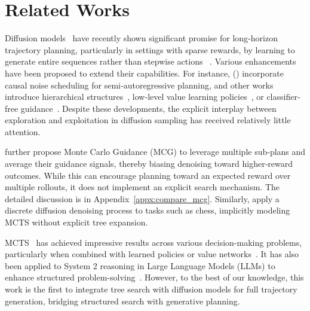 \section{Related Works}
Diffusion models~\citep{diffusion} have recently shown significant promise for long‐horizon trajectory planning, particularly in settings with sparse rewards, by learning to generate entire sequences rather than stepwise actions~ \citep{diffuser, diffusion_forcing, decisiondiffuer, d-mpc, hd, plandq, hmd}. Various enhancements have been proposed to extend their capabilities. For instance, \citeauthor{diffusion_forcing}(\citeyear{diffusion_forcing}) incorporate causal noise scheduling for semi‐autoregressive planning, and other works introduce hierarchical structures~\citep{hd, plandq, hmd}, low‐level value learning policies~\citep{plandq}, or classifier‐free guidance~\citep{decisiondiffuer, d-mpc}. Despite these developments, the explicit interplay between exploration and exploitation in diffusion sampling has received relatively little attention.

\citet{diffusion_forcing} further propose Monte Carlo Guidance (MCG) to leverage multiple sub‐plans and average their guidance signals, thereby biasing denoising toward higher‐reward outcomes. While this can encourage planning toward an expected reward over multiple rollouts, it does not implement an explicit search mechanism. The detailed discussion is in Appendix~\ref{appx:compare_mcg}. Similarly, \citet{anonymous2024implicit} apply a discrete diffusion denoising process to tasks such as chess, implicitly modeling MCTS without explicit tree expansion. 

MCTS~\citep{mcts} has achieved impressive results across various decision-making problems, particularly when combined with learned policies or value networks~\citep{mcts_alphago, muzero}. It has also been applied to System 2 reasoning in Large Language Models (LLMs) to enhance structured problem-solving~\citep{xiang2025towards, ToT, zhang2024rest}. However, to the best of our knowledge, this work is the first to integrate tree search with diffusion models for full trajectory generation, bridging structured search with generative planning.


